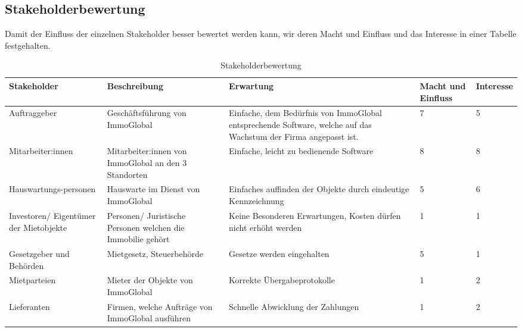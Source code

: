 \subsection{Stakeholderbewertung}
Damit der Einfluss der einzelnen Stakeholder besser bewertet werden kann, wir deren Macht und Einfluss und das Interesse in einer Tabelle festgehalten.

\begin{table}[H]
  \centering
  \settowidth{}
  \setlength\extrarowheight{2pt}
  \begin{tabulary}{1.0\textwidth}{|L|L|L|a|z|}
    \hline
    \textbf{Stakeholder} & 
    \textbf{Beschreibung} & 
    \textbf{Erwartung}& 
    \textbf{Macht und Einfluss} & 
    \textbf{Interesse}\\
    \hline
    Auftraggeber & 
    Geschäftsführung von ImmoGlobal& 
    Einfache, dem Bedürfnis von ImmoGlobal entsprechende Software, welche auf das Wachstum der Firma angepasst ist. &
    7 &
    5 \\ 
    \hline
    Mitarbeiter:innen & 
    Mitarbeiter:innen von ImmoGlobal an den 3 Standorten & 
    Einfache, leicht zu bedienende Software&
    8 &
    8 \\
    \hline
    Hauswartungs-personen & 
    Hauswarte im Dienst von ImmoGlobal &
    Einfaches auffinden der Objekte durch eindeutige Kennzeichnung &
    5 &
    6 \\
    \hline
    Investoren/ Eigentümer der Mietobjekte & 
    Personen/ Juristische Personen welchen die Immobilie gehört &
    Keine Besonderen Erwartungen, Kosten dürfen nicht erhöht werden &
    1 &
    1 \\
    \hline
    Gesetzgeber und Behörden &
    Mietgesetz, Steuerbehörde &
    Gesetze werden eingehalten &
    5 &
    1 \\
    \hline
    Mietparteien & 
    Mieter der Objekte von ImmoGlobal &
    Korrekte Übergabeprotokolle &
    1 &
    2 \\
    \hline
    Lieferanten & 
    Firmen, welche Aufträge von ImmoGlobal ausführen &
    Schnelle Abwicklung der Zahlungen &
    1 &
    2 \\
    \hline
  \end{tabulary}
  \caption{Stakeholderbewertung}
  \label{Stakeholderbewertung}
\end{table}

